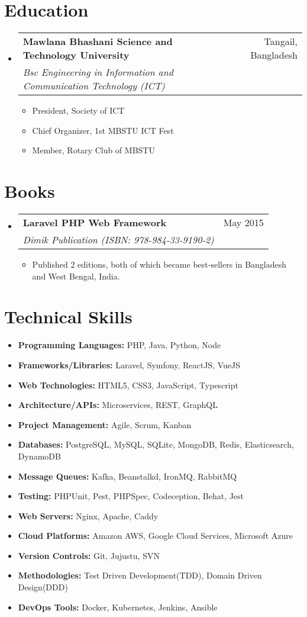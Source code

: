 \documentclass[a4paper,11pt]{article}
\makeatletter
\newcommand{\resumeSubheading}[4]{
  \vspace{1.5pt}\item
    \begin{tabular*}{0.97\textwidth}[t]{l@{\extracolsep{\fill}}r}
      \textbf{\large{#1}} \small{\textit{#4}} & #2 \\
      \textsl{#3}
    \end{tabular*}\vspace{-7pt}
}
\newcommand{\resumeSubHeadingListStart}{\begin{itemize}[leftmargin=0.15in, label={}]}
\newcommand{\resumeSubHeadingListEnd}{\end{itemize}}
\newcommand{\resumeItemListStart}{\begin{itemize}}
\newcommand{\resumeItemListEnd}{\end{itemize}\vspace{-5pt}}
\newcommand{\resumeItem}[1]{
  \item\small{
    {#1 \vspace{-2pt}}
  }
}
\makeatother
\begin{document}
\section{Education}
  \resumeSubHeadingListStart
    \resumeSubheading
      {Mawlana Bhashani Science and Technology University}{Tangail, Bangladesh}
      {Bsc Engineering in Information and Communication Technology (ICT)}{}
      \resumeItemListStart
        \resumeItem{President, Society of ICT}
        \resumeItem{Chief Organizer, 1st MBSTU ICT Fest}
        \resumeItem{Member, Rotary Club of MBSTU}
      \resumeItemListEnd
        
  \resumeSubHeadingListEnd


\section{Books}
  \resumeSubHeadingListStart    
    \resumeSubheading
      {\textbf{Laravel PHP Web Framework}}{May 2015}
      {Dimik Publication (ISBN: 978-984-33-9190-2)} {}
      \resumeItemListStart
        \resumeItem{Published 2 editions, both of which became best-sellers in Bangladesh and West Bengal, India.}
    \resumeItemListEnd
  \resumeSubHeadingListEnd


\section{Technical Skills}
 \begin{itemize}[leftmargin=0.15in, label={}]    
    \resumeItemListStart
      \resumeItem{\textbf{Programming Languages:} PHP, Java, Python, Node}
      \resumeItem{\textbf{Frameworks/Libraries:} Laravel, Symfony, ReactJS, VueJS}
      \resumeItem{\textbf{Web Technologies:} HTML5, CSS3, JavaScript, Typescript}
      \resumeItem{\textbf{Architecture/APIs:} Microservices, REST, GraphQL}
      \resumeItem{\textbf{Project Management:} Agile, Scrum, Kanban}
      \resumeItem{\textbf{Databases:} PostgreSQL, MySQL, SQLite, MongoDB, Redis, Elasticsearch, DynamoDB}
      \resumeItem{\textbf{Message Queues:} Kafka, Beanstalkd, IronMQ, RabbitMQ}
      \resumeItem{\textbf{Testing:} PHPUnit, Pest, PHPSpec, Codeception, Behat, Jest}
      \resumeItem{\textbf{Web Servers:} Nginx, Apache, Caddy}
      \resumeItem{\textbf{Cloud Platforms:} Amazon AWS, Google Cloud Services, Microsoft Azure}
      \resumeItem{\textbf{Version Controls:} Git, Jujustu, SVN}
      \resumeItem{\textbf{Methodologies:} Test Driven Development(TDD), Domain Driven Design(DDD)}
      \resumeItem{\textbf{DevOps Tools:} Docker, Kubernetes, Jenkins, Ansible}
    \resumeItemListEnd
 \end{itemize}
 
\end{document}
